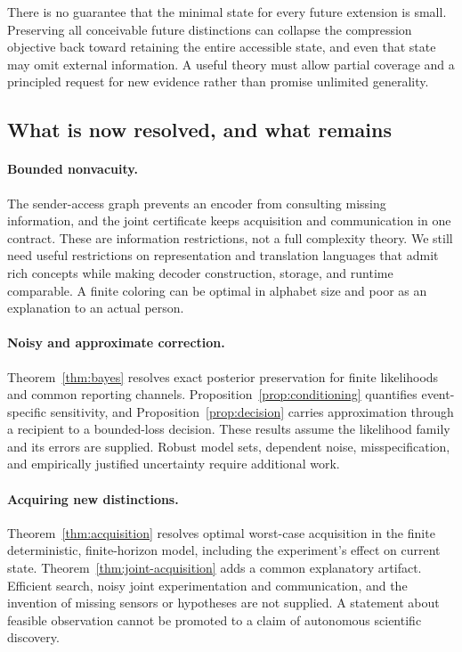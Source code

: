 \documentclass[11pt,letterpaper]{article}
\theoremstyle{plain}
\theoremstyle{definition}
\begin{document}
There is no guarantee that the minimal state for every future extension is small. Preserving all conceivable future distinctions can collapse the compression objective back toward retaining the entire accessible state, and even that state may omit external information. A useful theory must allow partial coverage and a principled request for new evidence rather than promise unlimited generality.

\subsection{What is now resolved, and what remains}
\paragraph{Bounded nonvacuity.}
The sender-access graph prevents an encoder from consulting missing information, and the joint certificate keeps acquisition and communication in one contract. These are information restrictions, not a full complexity theory. We still need useful restrictions on representation and translation languages that admit rich concepts while making decoder construction, storage, and runtime comparable. A finite coloring can be optimal in alphabet size and poor as an explanation to an actual person.

\paragraph{Noisy and approximate correction.}
Theorem~\ref{thm:bayes} resolves exact posterior preservation for finite likelihoods and common reporting channels. Proposition~\ref{prop:conditioning} quantifies event-specific sensitivity, and Proposition~\ref{prop:decision} carries approximation through a recipient to a bounded-loss decision. These results assume the likelihood family and its errors are supplied. Robust model sets, dependent noise, misspecification, and empirically justified uncertainty require additional work.

\paragraph{Acquiring new distinctions.}
Theorem~\ref{thm:acquisition} resolves optimal worst-case acquisition in the finite deterministic, finite-horizon model, including the experiment's effect on current state. Theorem~\ref{thm:joint-acquisition} adds a common explanatory artifact. Efficient search, noisy joint experimentation and communication, and the invention of missing sensors or hypotheses are not supplied. A statement about feasible observation cannot be promoted to a claim of autonomous scientific discovery.
\end{document}
